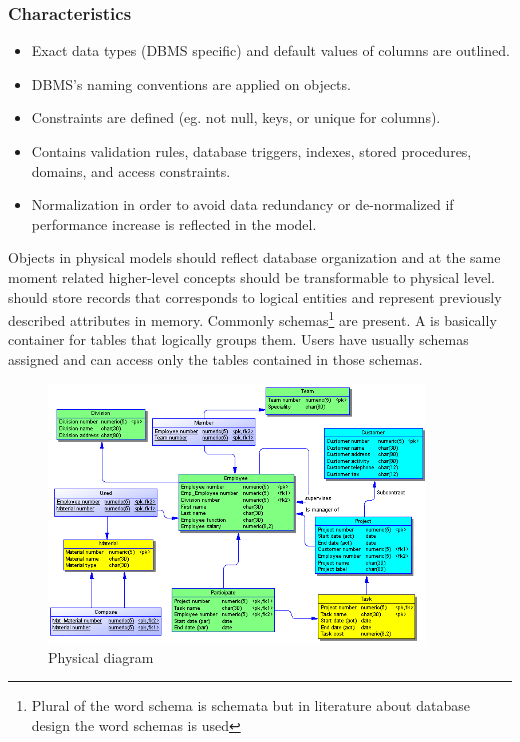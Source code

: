 \subsubsection{Characteristics}
\begin{itemize}
	\item Exact data types (DBMS specific) and default values of columns are outlined.
	\item DBMS's naming conventions are applied on objects.
	\item Constraints are defined (eg. not null, keys, or unique for columns).
	\item Contains validation rules, database triggers, indexes, stored procedures, domains, and access constraints.
	\item Normalization in order to avoid data redundancy or de-normalized if performance increase is reflected in the model.
\end{itemize}

Objects in physical models should reflect database organization and at the same moment related higher-level concepts should be transformable to physical level.  should store records that corresponds to logical entities and  represent previously described attributes in memory.
Commonly schemas\footnote{Plural of the word schema is schemata but in literature about database design the word schemas is used} are present. A  is basically container for tables that logically groups them. Users have usually schemas assigned and can access only the tables contained in those schemas.

\begin{figure}[H]
	\centering
	\includegraphics[width=10cm]{../img/Physical_Model_PowerDesigner}
	\caption{Physical diagram\cite{PowerDesignerDocumentation}}
\end{figure}

